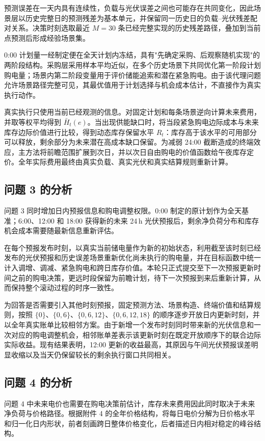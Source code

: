 预测误差在一天内具有连续性，负载与光伏误差之间也可能存在共同变化，因此场景层以历史完整日的预测残差为基本单元，并保留同一历史日的负载--光伏残差配对关系。决策时刻选取最近 $M=30$ 条已经完整实现的历史残差路径，叠加到当前点预测后形成经验场景集。

0:00 计划量一经制定便在全天计划内冻结，具有"先确定采购、后观察随机实现"的两阶段结构。采购层采用样本平均近似\cite{saa-book,kleywegt}，在多个历史场景下共同优化第一阶段计划购电量；场景内第二阶段变量用于评价储能追索和潜在紧急购电。由于该代理问题允许场景路径完整可见，其最优值用于计划选择与机会成本估计，不直接作为真实执行动作。

真实执行只使用当前已经观测的信息。对固定计划和每条场景逆向计算未来费用，并取等权平均得到 $\bar H_t(e)$。当出现供能缺口时，将当段紧急购电边际成本与未来库存边际价值进行比较，得到动态库存保留水平 $R_t$：库存高于该水平的可用部分可以释放，剩余部分为未来潜在高成本缺口保留。为减弱 24:00 截断造成的终端效应，主方法将前瞻范围扩展到次日，并以次日自由购电的价值函数给午夜库存定价。全年实际费用最终由真实负载、真实光伏和真实结算规则重新计算。

\subsection{问题 3 的分析}
问题 3 同时增加日内预报信息和购电调整权限。0:00 制定的原计划作为全天基准；6:00、12:00 和 18:00 获得新的未来 24\,h 光伏预报后，剩余净负荷分布和库存机会成本需要随最新信息重新评估。

在每个预报发布时刻，以真实当前储电量作为新的初始状态，利用截至该时刻已经发布的光伏预报和历史误差场景重新优化尚未执行的购电量，并在目标函数中统一计入调增、调减、紧急购电和跨日库存价值。本轮只正式提交至下一次预报更新时间之前的购电决策，更远时段保留为前瞻计划，待下一次预报到来后重新计算，从而保持整个滚动过程的时序一致性。

为回答是否需要引入其他时刻预报，固定预测方法、场景构造、终端价值和结算规则，按照 $\{0\}$、$\{0,6\}$、$\{0,6,12\}$、$\{0,6,12,18\}$ 的顺序逐步开放日内更新时刻，并以全年真实账单比较相邻方案。由于新增一个发布时刻同时带来新的光伏信息和一次对应的购电调整机会，相邻账单差表示该更新时刻在既定开放顺序下的联合边际实际收益。现有结果表明，12:00 更新的收益最高，其原因与午间光伏预报误差明显收缩以及当天仍保留较长的剩余执行窗口共同相关。

\subsection{问题 4 的分析}
问题 4 中未来电价也需要在购电决策前估计，库存未来费用因此同时取决于未来净负荷与价格路径。根据附件 4 的全年价格结构，将每日电价分解为日价格水平和归一化日内形状，前者刻画跨日整体价格变化，后者描述日内相对稳定的峰谷结构。

